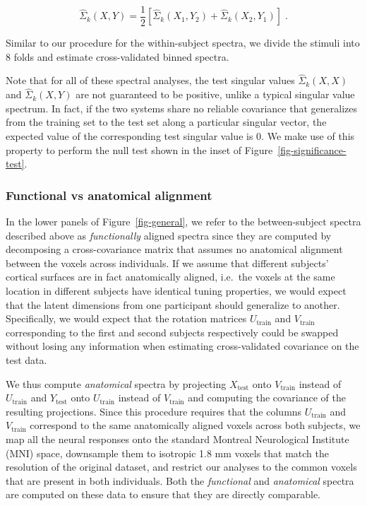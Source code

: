 \documentclass[10pt]{article}
\begin{document}
\[
\hat{\Sigma}_k(X,Y) = \frac{1}{2}\left[\hat{\Sigma}_k(X_1,Y_2) + \hat{\Sigma}_k(X_2,Y_1)\right]\;.
\]

Similar to our procedure for the within-subject spectra, we divide the
stimuli into 8 folds and estimate cross-validated binned spectra.

Note that for all of these spectral analyses, the test singular values
\(\hat{\Sigma}_k(X, X)\) and \(\hat{\Sigma}_k(X, Y)\) are not guaranteed
to be positive, unlike a typical singular value spectrum. In fact, if
the two systems share no reliable covariance that generalizes from the
training set to the test set along a particular singular vector, the
expected value of the corresponding test singular value is \(0\). We
make use of this property to perform the null test shown in the inset of
Figure~\ref{fig-significance-test}.

\subsubsection{Functional vs anatomical
alignment}\label{functional-vs-anatomical-alignment}

In the lower panels of Figure~\ref{fig-general}, we refer to the
between-subject spectra described above as \emph{functionally} aligned
spectra since they are computed by decomposing a cross-covariance matrix
that assumes no anatomical alignment between the voxels across
individuals. If we assume that different subjects' cortical surfaces are
in fact anatomically aligned, i.e.~the voxels at the same location in
different subjects have identical tuning properties, we would expect
that the latent dimensions from one participant should generalize to
another. Specifically, we would expect that the rotation matrices
\(U_\text{train}\) and \(V_\text{train}\) corresponding to the first and
second subjects respectively could be swapped without losing any
information when estimating cross-validated covariance on the test data.

We thus compute \emph{anatomical} spectra by projecting
\(X_\text{test}\) onto \(V_\text{train}\) instead of \(U_\text{train}\)
and \(Y_\text{test}\) onto \(U_\text{train}\) instead of
\(V_\text{train}\) and computing the covariance of the resulting
projections. Since this procedure requires that the columns
\(U_\text{train}\) and \(V_\text{train}\) correspond to the same
anatomically aligned voxels across both subjects, we map all the neural
responses onto the standard Montreal Neurological Institute (MNI) space,
downsample them to isotropic 1.8 mm voxels that match the resolution of
the original dataset, and restrict our analyses to the common voxels
that are present in both individuals. Both the \emph{functional} and
\emph{anatomical} spectra are computed on these data to ensure that they
are directly comparable.
\end{document}
